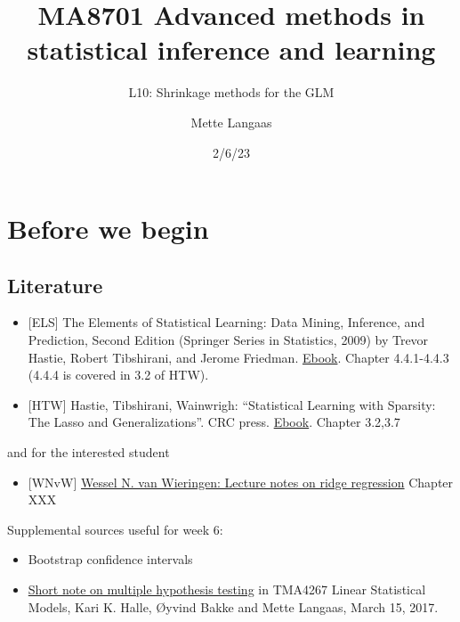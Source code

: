 \documentclass[
  letterpaper,
  DIV=11,
  numbers=noendperiod]{scrartcl}
\title{MA8701 Advanced methods in statistical inference and learning}
\subtitle{L10: Shrinkage methods for the GLM}
\author{Mette Langaas}
\date{2/6/23}
\providecommand{\tightlist}{%
  \setlength{\itemsep}{0pt}\setlength{\parskip}{0pt}}\usepackage{longtable,booktabs,array}
\renewcommand*\contentsname{Table of contents}
\newcommand\contentsname{Table of contents}
\begin{document}
\maketitle
\ifdefined\Shaded\renewenvironment{Shaded}{\begin{tcolorbox}[borderline west={3pt}{0pt}{shadecolor}, frame hidden, boxrule=0pt, sharp corners, enhanced, interior hidden, breakable]}{\end{tcolorbox}}\fi

\renewcommand*\contentsname{Table of contents}
{
\hypersetup{linkcolor=}
\setcounter{tocdepth}{3}
\tableofcontents
}
\hypertarget{before-we-begin}{%
\section{Before we begin}\label{before-we-begin}}

\hypertarget{literature}{%
\subsection{Literature}\label{literature}}

\begin{itemize}
\item
  {[}ELS{]} The Elements of Statistical Learning: Data Mining,
  Inference, and Prediction, Second Edition (Springer Series in
  Statistics, 2009) by Trevor Hastie, Robert Tibshirani, and Jerome
  Friedman.
  \href{https://web.stanford.edu/~hastie/Papers/ESLII.pdf}{Ebook}.
  Chapter 4.4.1-4.4.3 (4.4.4 is covered in 3.2 of HTW).
\item
  {[}HTW{]} Hastie, Tibshirani, Wainwrigh: ``Statistical Learning with
  Sparsity: The Lasso and Generalizations''. CRC press.
  \href{https://hastie.su.domains/StatLearnSparsity/}{Ebook}. Chapter
  3.2,3.7
\end{itemize}

and for the interested student

\begin{itemize}
\tightlist
\item
  {[}WNvW{]} \href{https://arxiv.org/pdf/1509.09169v7.pdf}{Wessel N. van
  Wieringen: Lecture notes on ridge regression} Chapter XXX
\end{itemize}

Supplemental sources useful for week 6:

\begin{itemize}
\tightlist
\item
  Bootstrap confidence intervals
\item
  \href{https://www.math.ntnu.no/emner/TMA4267/2017v/multtest.pdf}{Short
  note on multiple hypothesis testing} in TMA4267 Linear Statistical
  Models, Kari K. Halle, Øyvind Bakke and Mette Langaas, March 15, 2017.
\end{itemize}
\end{document}
